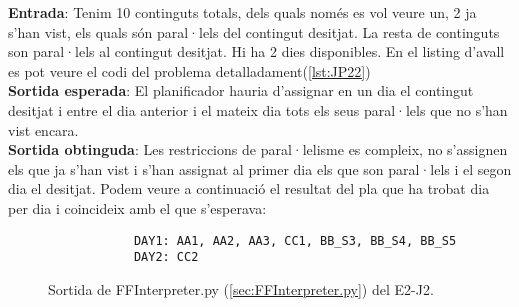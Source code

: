 \documentclass[a4paper]{article}
\begin{document}
	\noindent \textbf{Entrada}: Tenim 10 continguts totals, dels quals només es vol veure un, 2 ja s'han vist, els quals són paral·lels del contingut desitjat. La resta de continguts son paral·lels al contingut desitjat. Hi ha 2 dies disponibles. En el listing d'avall es pot veure el codi del problema detalladament(\ref{lst:JP22})\\
	
	\noindent \textbf{Sortida esperada}: El planificador hauria d'assignar en un dia el contingut desitjat i entre el dia anterior i el mateix dia tots els seus paral·lels que no s'han vist encara. \\
	
	\noindent \textbf{Sortida obtinguda}: Les restriccions de paral·lelisme es compleix, no s'assignen els que ja s'han vist i s'han assignat al primer dia els que son paral·lels i el segon dia el desitjat. Podem veure a continuació el resultat del pla que ha trobat dia per dia i coincideix amb el que s'esperava:
	
	\begin{figure}[H]
		\centering
		\begin{verbatim}
			DAY1: AA1, AA2, AA3, CC1, BB_S3, BB_S4, BB_S5
			DAY2: CC2
		\end{verbatim}
		\caption{Sortida de FFInterpreter.py (\ref{sec:FFInterpreter.py}) del E2-J2.}
	\end{figure}
	
\end{document}
